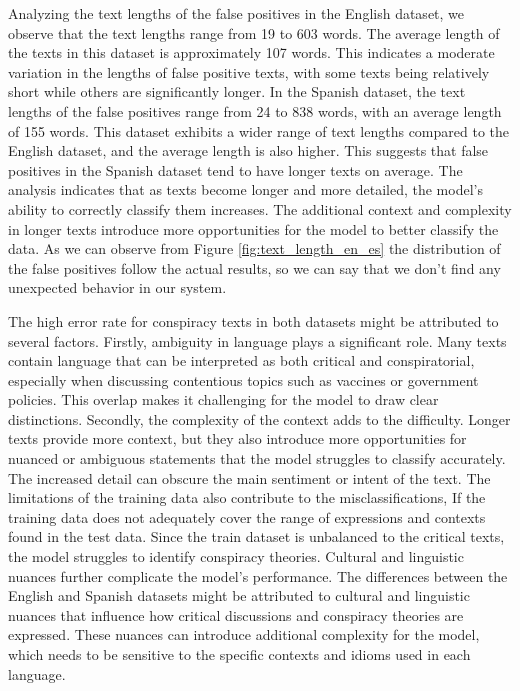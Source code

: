 \documentclass{Configuration_Files/PoliMi3i_thesis}
\begin{document}
Analyzing the text lengths of the false positives in the English dataset, we observe that the text lengths range from 19 to 603 words. The average length of the texts in this dataset is approximately 107 words. This indicates a moderate variation in the lengths of false positive texts, with some texts being relatively short while others are significantly longer. In the Spanish dataset, the text lengths of the false positives range from 24 to 838 words, with an average length of 155 words. This dataset exhibits a wider range of text lengths compared to the English dataset, and the average length is also higher. This suggests that false positives in the Spanish dataset tend to have longer texts on average. The analysis indicates that as texts become longer and more detailed, the model's ability to correctly classify them increases. The additional context and complexity in longer texts introduce more opportunities for the model to better classify the data. As we can observe from Figure \ref{fig:text_length_en_es} the distribution of the false positives follow the actual results, so we can say that we don't find any unexpected behavior in our system.

The high error rate for conspiracy texts in both datasets might be attributed to several factors. Firstly, ambiguity in language plays a significant role. Many texts contain language that can be interpreted as both critical and conspiratorial, especially when discussing contentious topics such as vaccines or government policies. This overlap makes it challenging for the model to draw clear distinctions.
Secondly, the complexity of the context adds to the difficulty. Longer texts provide more context, but they also introduce more opportunities for nuanced or ambiguous statements that the model struggles to classify accurately. The increased detail can obscure the main sentiment or intent of the text.
The limitations of the training data also contribute to the misclassifications, If the training data does not adequately cover the range of expressions and contexts found in the test data. Since the train dataset is unbalanced to the critical texts, the model struggles to identify conspiracy theories.
Cultural and linguistic nuances further complicate the model's performance. The differences between the English and Spanish datasets might be attributed to cultural and linguistic nuances that influence how critical discussions and conspiracy theories are expressed. These nuances can introduce additional complexity for the model, which needs to be sensitive to the specific contexts and idioms used in each language.
\end{document}
